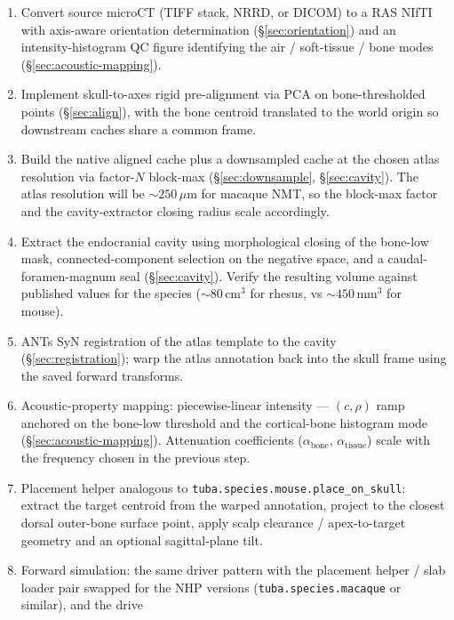 \documentclass{compactarticle}
\begin{document}
\begin{enumerate}[leftmargin=*]
\item Convert source microCT (TIFF stack, NRRD, or DICOM) to a RAS
      NIfTI with axis-aware orientation determination
      (\S\ref{sec:orientation}) and an intensity-histogram QC figure
      identifying the air / soft-tissue / bone modes
      (\S\ref{sec:acoustic-mapping}).
\item Implement skull-to-axes rigid pre-alignment via PCA on
      bone-thresholded points (\S\ref{sec:align}), with the bone
      centroid translated to the world origin so downstream caches
      share a common frame.
\item Build the native aligned cache plus a downsampled cache at
      the chosen atlas resolution via factor-$N$ block-max
      (\S\ref{sec:downsample}, \S\ref{sec:cavity}). The atlas
      resolution will be $\sim 250$\,$\mu$m for macaque NMT, so the
      block-max factor and the cavity-extractor closing radius scale
      accordingly.
\item Extract the endocranial cavity using morphological closing of
      the bone-low mask, connected-component selection on the
      negative space, and a caudal-foramen-magnum seal
      (\S\ref{sec:cavity}). Verify the resulting volume against
      published values for the species ($\sim 80$\,cm$^3$ for
      rhesus, vs $\sim 450$\,mm$^3$ for mouse).
\item ANTs SyN registration of the atlas template to the cavity
      (\S\ref{sec:registration}); warp the atlas annotation back into
      the skull frame using the saved forward transforms.
\item Acoustic-property mapping: piecewise-linear intensity ---
      $(c, \rho)$ ramp anchored on the bone-low threshold and the
      cortical-bone histogram mode (\S\ref{sec:acoustic-mapping}).
      Attenuation coefficients ($\alpha_{\mathrm{bone}}$,
      $\alpha_{\mathrm{tissue}}$) scale with the frequency chosen in
      the previous step.
\item Placement helper analogous to
      \texttt{tuba.species.mouse.\allowbreak place\_on\_skull}: extract
      the target centroid from the warped annotation,
      project to the closest dorsal outer-bone surface point, apply
      scalp clearance / apex-to-target geometry and an optional
      sagittal-plane tilt.
\item Forward simulation: the same driver pattern with the placement
      helper / slab loader pair swapped for the NHP versions
      (\texttt{tuba.species.macaque} or similar), and the drive

\end{enumerate}
\end{document}
